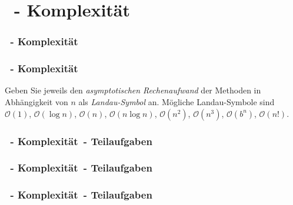 \def\stitle{\theexercise\ - Komplexit\"at}

\section{\stitle}
\begin{frame}
  \frametitle{\stitle}%
\tableofcontents[current]
\end{frame}


\begin{frame}%
  \frametitle{\stitle}%

Geben Sie jeweils den \emph{asymptotischen Rechenaufwand} der Methoden in Abh\"angigkeit von $n$ als \emph{Landau-Symbol} an.
M\"ogliche Landau-Symbole sind $\mathcal{O}(1)$, $\mathcal{O}(\log n)$, $\mathcal{O}(n)$, $\mathcal{O}(n \log n)$, $\mathcal{O}(n^2)$, $\mathcal{O}(n^3)$, $\mathcal{O}(b^n)$, $\mathcal{O}(n!)$.
\medskip



\end{frame}

\begin{frame}%
  \frametitle{\stitle\ - Teilaufgaben}%


\end{frame}

\begin{frame}[t]%
  \frametitle{\stitle\ - Teilaufgaben}%


\end{frame}

\begin{frame}[t]%
  \frametitle{\stitle\ - Teilaufgaben}%

\end{frame}
